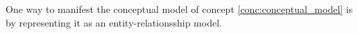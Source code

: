 \begin{tool} \label{tool:conceptual_model} 
  One way to manifest the conceptual model of concept \ref{conc:conceptual_model} is by representing it as an entity-relationsship model. \cite[p. 199-200]{benyon_14}
\end{tool}
